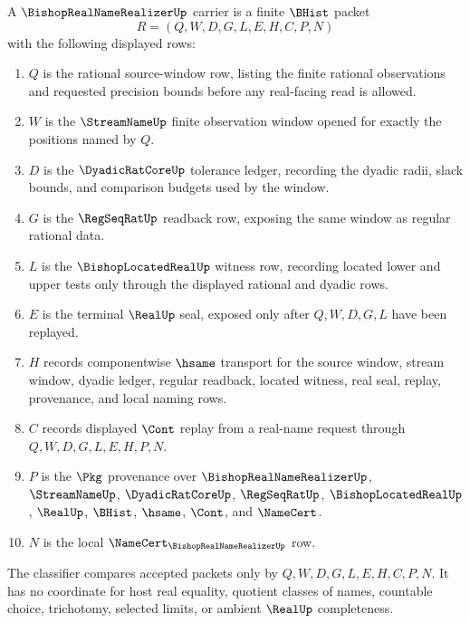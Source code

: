 \begin{definition}
\label{def:bishop-real-name-realizer-carrier}
A $\BishopRealNameRealizerUp$ carrier is a finite $\BHist$ packet
$$
R=(Q,W,D,G,L,E,H,C,P,N)
$$
with the following displayed rows:
\begin{enumerate}
\item $Q$ is the rational source-window row, listing the finite rational observations and requested precision bounds before any real-facing read is allowed.
\item $W$ is the $\StreamNameUp$ finite observation window opened for exactly the positions named by $Q$.
\item $D$ is the $\DyadicRatCoreUp$ tolerance ledger, recording the dyadic radii, slack bounds, and comparison budgets used by the window.
\item $G$ is the $\RegSeqRatUp$ readback row, exposing the same window as regular rational data.
\item $L$ is the $\BishopLocatedRealUp$ witness row, recording located lower and upper tests only through the displayed rational and dyadic rows.
\item $E$ is the terminal $\RealUp$ seal, exposed only after $Q,W,D,G,L$ have been replayed.
\item $H$ records componentwise $\hsame$ transport for the source window, stream window, dyadic ledger, regular readback, located witness, real seal, replay, provenance, and local naming rows.
\item $C$ records displayed $\Cont$ replay from a real-name request through $Q,W,D,G,L,E,H,P,N$.
\item $P$ is the $\Pkg$ provenance over $\BishopRealNameRealizerUp$, $\StreamNameUp$, $\DyadicRatCoreUp$, $\RegSeqRatUp$, $\BishopLocatedRealUp$, $\RealUp$, $\BHist$, $\hsame$, $\Cont$, and $\NameCert$.
\item $N$ is the local $\NameCert_{\BishopRealNameRealizerUp}$ row.
\end{enumerate}
The classifier compares accepted packets only by $Q,W,D,G,L,E,H,C,P,N$. It has no coordinate for host real equality, quotient classes of names, countable choice, trichotomy, selected limits, or ambient $\RealUp$ completeness.
\end{definition}

